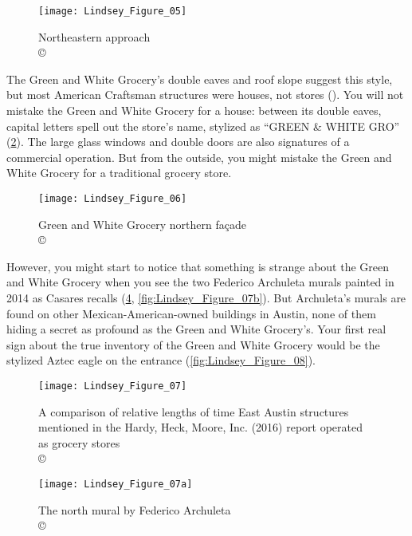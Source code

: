 \begin{figure}[!htb]
	\texttt{[image: Lindsey\_Figure\_05]}
	\caption{Northeastern approach\\
		{\normalfont\scriptsize \copyright\
			\shortauthor
	}}
	\label{fig:Lindsey_Figure_05}
\end{figure}

The Green and White Grocery's double eaves and roof slope suggest this style, but most American Craftsman structures were houses, not stores (\cite{robinson}). You will not mistake the Green and White Grocery for a house: between its double eaves, capital letters spell out the store's name, stylized as “GREEN \& WHITE GRO” (\cref{fig:Lindsey_Figure_06}). The large glass windows and double doors are also signatures of a commercial operation. But from the outside, you might mistake the Green and White Grocery for a traditional grocery store.

\begin{figure}[!htb]
	\texttt{[image: Lindsey\_Figure\_06]}
	\caption{Green and White Grocery northern façade\\
		{\normalfont\scriptsize \copyright\
			\shortauthor
	}}
	\label{fig:Lindsey_Figure_06}
\end{figure}

However, you might start to notice that something is strange about the Green and White Grocery when you see the two Federico Archuleta murals painted in 2014 as Casares recalls (\cref{fig:Lindsey_Figure_07a}, \cref{fig:Lindsey_Figure_07b}). But Archuleta's murals are found on other Mexican-American-owned buildings in Austin, none of them hiding a secret as profound as the Green and White Grocery's. Your first real sign about the true inventory of the Green and White Grocery would be the stylized Aztec eagle on the entrance (\cref{fig:Lindsey_Figure_08}).

\begin{figure}[!htb]
	\texttt{[image: Lindsey\_Figure\_07]}
	\caption{A comparison of relative lengths of time East Austin structures mentioned in the Hardy, Heck, Moore, Inc. (2016) report operated as grocery stores\\
		{\normalfont\scriptsize \copyright\
			\shortauthor
	}}
	\label{fig:Lindsey_Figure_07}
\end{figure}


\begin{figure}[!htb]
	\texttt{[image: Lindsey\_Figure\_07a]}
	\caption{The north mural by Federico Archuleta\\
		{\normalfont\scriptsize \copyright\
			\shortauthor
	}}
	\label{fig:Lindsey_Figure_07a}
\end{figure}

